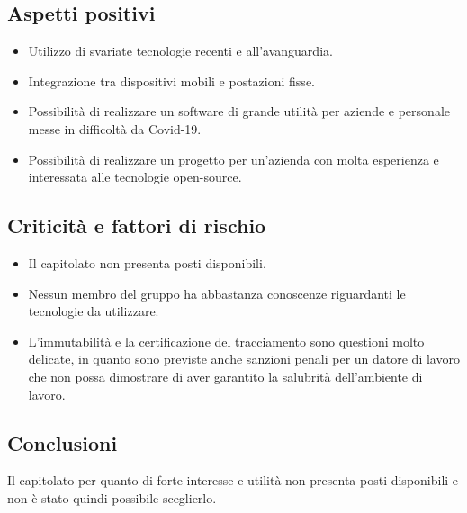 \subsection{Aspetti positivi}
\begin{itemize}
    \item Utilizzo di svariate tecnologie recenti e all'avanguardia.
    \item Integrazione tra dispositivi mobili e postazioni fisse.
    \item Possibilità di realizzare un software di grande utilità per aziende e personale messe in difficoltà da Covid-19.
    \item Possibilità di realizzare un progetto per un'azienda con molta esperienza e interessata alle tecnologie open-source.
\end{itemize}

\subsection{Criticità e fattori di rischio}
\begin{itemize}
    \item Il capitolato non presenta posti disponibili.
    \item Nessun membro del gruppo ha abbastanza conoscenze riguardanti le tecnologie da utilizzare.
    \item L'immutabilità e la certificazione del tracciamento sono questioni molto delicate, in quanto sono previste anche sanzioni penali per un datore di lavoro che non possa dimostrare di aver garantito la salubrità dell’ambiente di lavoro.
\end{itemize}

\subsection{Conclusioni}
Il capitolato per quanto di forte interesse e utilità non presenta posti disponibili e non è stato quindi possibile sceglierlo.